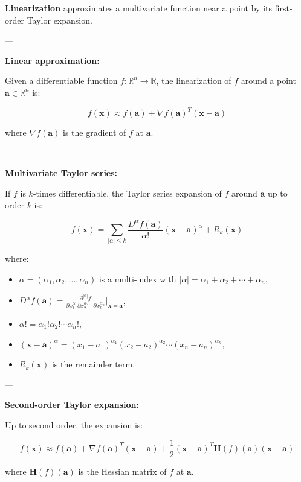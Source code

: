 \textbf{Linearization} approximates a multivariate function near a point by its first-order Taylor expansion.

---

\textbf{Linear approximation:}

Given a differentiable function \( f : \mathbb{R}^n \to \mathbb{R} \), the linearization of \( f \) around a point \( \mathbf{a} \in \mathbb{R}^n \) is:

\[
f(\mathbf{x}) \approx f(\mathbf{a}) + \nabla f(\mathbf{a})^T (\mathbf{x} - \mathbf{a})
\]

where \( \nabla f(\mathbf{a}) \) is the gradient of \( f \) at \( \mathbf{a} \).

---

\textbf{Multivariate Taylor series:}

If \( f \) is \( k \)-times differentiable, the Taylor series expansion of \( f \) around \( \mathbf{a} \) up to order \( k \) is:

\[
f(\mathbf{x}) = \sum_{|\alpha| \leq k} \frac{D^\alpha f(\mathbf{a})}{\alpha!} (\mathbf{x} - \mathbf{a})^\alpha + R_k(\mathbf{x})
\]

where:
\begin{itemize}
    \item \( \alpha = (\alpha_1, \alpha_2, \ldots, \alpha_n) \) is a multi-index with \( |\alpha| = \alpha_1 + \alpha_2 + \cdots + \alpha_n \),
    \item \( D^\alpha f(\mathbf{a}) = \frac{\partial^{|\alpha|} f}{\partial x_1^{\alpha_1} \partial x_2^{\alpha_2} \cdots \partial x_n^{\alpha_n}} \Big|_{\mathbf{x} = \mathbf{a}} \),
    \item \( \alpha! = \alpha_1! \alpha_2! \cdots \alpha_n! \),
    \item \( (\mathbf{x} - \mathbf{a})^\alpha = (x_1 - a_1)^{\alpha_1} (x_2 - a_2)^{\alpha_2} \cdots (x_n - a_n)^{\alpha_n} \),
    \item \( R_k(\mathbf{x}) \) is the remainder term.
\end{itemize}

---

\textbf{Second-order Taylor expansion:}

Up to second order, the expansion is:

\[
f(\mathbf{x}) \approx f(\mathbf{a}) + \nabla f(\mathbf{a})^T (\mathbf{x} - \mathbf{a}) + \frac{1}{2} (\mathbf{x} - \mathbf{a})^T \mathbf{H}(f)(\mathbf{a}) (\mathbf{x} - \mathbf{a})
\]

where \( \mathbf{H}(f)(\mathbf{a}) \) is the Hessian matrix of \( f \) at \( \mathbf{a} \).

